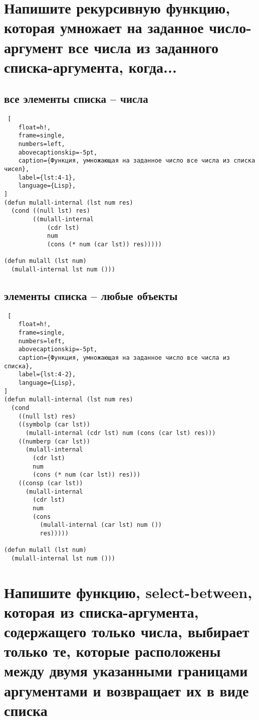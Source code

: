 \section{Напишите рекурсивную функцию, которая умножает на заданное число-аргумент все числа из заданного списка-аргумента, когда...}

\subsection{все элементы списка -- числа}

\begin{lstlisting} [
	float=h!,
	frame=single,
	numbers=left,
	abovecaptionskip=-5pt,
	caption={Функция, умножающая на заданное число все числа из списка чисел},
	label={lst:4-1},
	language={Lisp},
]
(defun mulall-internal (lst num res)
  (cond ((null lst) res)
        ((mulall-internal
            (cdr lst)
            num
            (cons (* num (car lst)) res)))))

(defun mulall (lst num)
  (mulall-internal lst num ()))
\end{lstlisting}

\clearpage

\subsection{элементы списка -- любые объекты}

\begin{lstlisting} [
	float=h!,
	frame=single,
	numbers=left,
	abovecaptionskip=-5pt,
	caption={Функция, умножающая на заданное число все числа из списка},
	label={lst:4-2},
	language={Lisp},
]
(defun mulall-internal (lst num res)
  (cond
    ((null lst) res)
    ((symbolp (car lst))
      (mulall-internal (cdr lst) num (cons (car lst) res)))
    ((numberp (car lst))
      (mulall-internal
        (cdr lst)
        num
        (cons (* num (car lst)) res)))
    ((consp (car lst))
      (mulall-internal
        (cdr lst)
        num
        (cons
          (mulall-internal (car lst) num ())
          res)))))

(defun mulall (lst num)
  (mulall-internal lst num ()))
\end{lstlisting}

\section{Напишите функцию, select-between, которая из списка-аргумента, содержащего только числа, выбирает только те, которые расположены между двумя указанными границами аргументами и возвращает их в виде списка}

